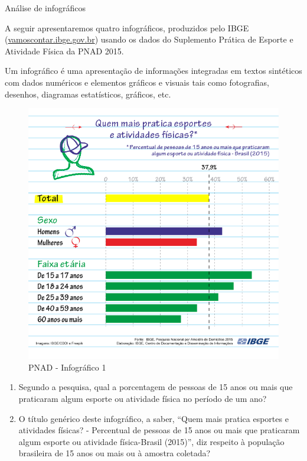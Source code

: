 \label{\detokenize{PE103-0:ativ4-analise-de-infograficos}}
\begin{task}{ Análise de infográficos}

A seguir apresentaremos quatro infográficos, produzidos pelo IBGE (\href{https://vamoscontar.ibge.gov.br/atividades/ensino-medio/9801-pesquisando-a-pratica-de-esportes-e-atividades-fisicas-no-brasil.html}{vamoscontar.ibge.gov.br}) usando os dados do Suplemento Prática de Esporte e Atividade Física da PNAD 2015.

Um infográfico é uma apresentação de informações integradas em textos sintéticos com dados numéricos e elementos gráficos e visuais tais como fotografias, desenhos, diagramas estatísticos, gráficos, etc.

\begin{figure}[H]
\centering
\capstart

\noindent\includegraphics[width=300bp]{PNAD_2015_Esportes_01quem2.png}
\caption{PNAD - Infográfico 1}\label{\detokenize{PE103-0:fig-infografico-pnad-1}}\label{\detokenize{PE103-0:id1}}\end{figure}
\begin{enumerate}
\item {} 
Segundo a pesquisa, qual a porcentagem de pessoas de 15 anos ou mais que praticaram algum esporte ou atividade física no período de um ano?

\item {} 
O título genérico deste infográfico, a saber, ``Quem mais pratica esportes e atividades físicas? - Percentual de pessoas de 15 anos ou mais que praticaram algum esporte ou atividade física-Brasil (2015)'', diz respeito à população brasileira de 15 anos ou mais ou à amostra coletada?


\end{enumerate}
\end{task}
